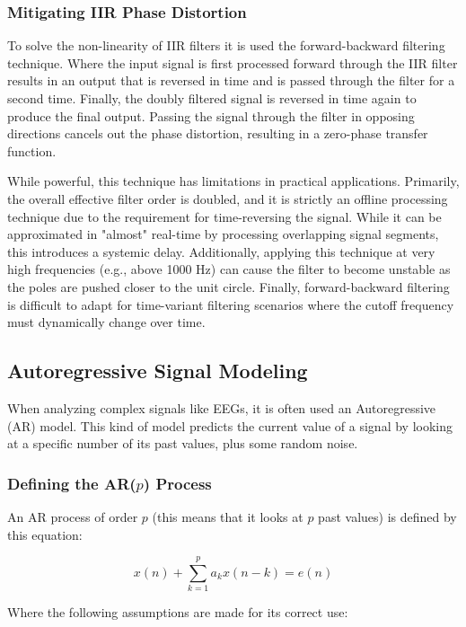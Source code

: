 \documentclass[11pt,a4paper]{article}
\begin{document}
\subsubsection{Mitigating IIR Phase Distortion}

To solve the non-linearity of IIR filters it is used the forward-backward filtering technique. Where the input signal is first processed forward through the IIR filter results in an output that is reversed in time and is passed through the filter for a second time. Finally, the doubly filtered signal is reversed in time again to produce the final output. Passing the signal through the filter in opposing directions cancels out the phase distortion, resulting in a zero-phase transfer function. 

While powerful, this technique has limitations in practical applications. Primarily, the overall effective filter order is doubled, and it is strictly an offline processing technique due to the requirement for time-reversing the signal. While it can be approximated in "almost" real-time by processing overlapping signal segments, this introduces a systemic delay. Additionally, applying this technique at very high frequencies (e.g., above 1000 Hz) can cause the filter to become unstable as the poles are pushed closer to the unit circle. Finally, forward-backward filtering is difficult to adapt for time-variant filtering scenarios where the cutoff frequency must dynamically change over time. 

\subsection{Autoregressive Signal Modeling}

When analyzing complex signals like EEGs, it is often used an Autoregressive (AR) model. This kind of model predicts the current value of a signal by looking at a specific number of its past values, plus some random noise. 

\subsubsection{Defining the AR($p$) Process}

An AR process of order $p$ (this means that it looks at $p$ past values) is defined by this equation:

\[
x(n) + \sum_{k=1}^{p} a_k x(n-k) = e(n)
\]

Where the following assumptions are made for its correct use:
\end{document}
